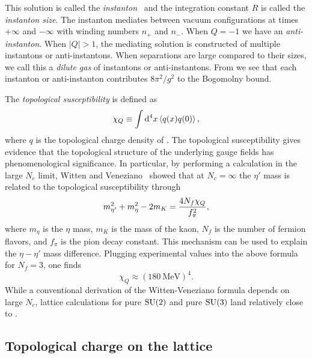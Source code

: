 This solution is called the {\it instanton}~\cite{belavin_pseudoparticle_1975}
and the integration constant $R$ is called the 
{\it instanton size}. 
The instanton mediates between vacuum configurations at times
$+\infty$ and $-\infty$ with winding numbers $n_+$ and $n_-$.
When $Q=-1$ we have an {\it anti-instanton}.
When $|Q|>1$, the mediating solution is constructed of multiple 
instantons or anti-instantons. When separations are large compared
to their sizes, we call this a {\it dilute gas} of instantons
or anti-instantons. From 
we see that each instanton or anti-instanton contributes
$8\pi^2/g^2$ to the Bogomolny bound.

The {\it topological susceptibility} is defined as
\begin{equation}
  \chi_Q\equiv\int\dd[4]{x}\ev{q(x)q(0)},
\end{equation}
where $q$ is the topological charge density of .
The topological susceptibility gives evidence that the topological
structure of the underlying gauge fields has phenomenological significance.
In particular, by performing a calculation in the large $N_c$ limit, 
Witten and Veneziano~\cite{witten_current_1979,veneziano_u1_1979} showed
that at $N_c=\infty$ the $\eta'$ mass is related to 
the topological susceptibility through
\begin{equation}\index{Witten-Veneziano formula}
  m_{\eta'}^2+m_\eta^2-2m_K=\frac{4N_f\chi_Q}{f_\pi^2},
\end{equation}
where $m_\eta$ is the $\eta$ mass, $m_K$ is the mass of the kaon, 
$N_f$ is the number of fermion flavors, and $f_\pi$ is the
pion decay constant. This mechanism can be used to explain the 
$\eta-\eta'$ mass difference. 
Plugging experimental values into the above
formula for $N_f=3$, one finds
\begin{equation}\label{eq:chivalue}
  \chi_Q\approx(180~\text{MeV})^4.
\end{equation}
While a conventional derivation of the Witten-Veneziano formula depends
on large $N_c$, lattice calculations for pure $\operatorname{SU}(2)$ and
pure $\operatorname{SU}(3)$ land relatively close to .

\subsection{Topological charge on the lattice}\label{sec:toplat}

